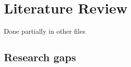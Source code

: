 \chapter{Literature Review\label{chap:literature_review}}
 Done partially  in other files
\section{Research gaps}

